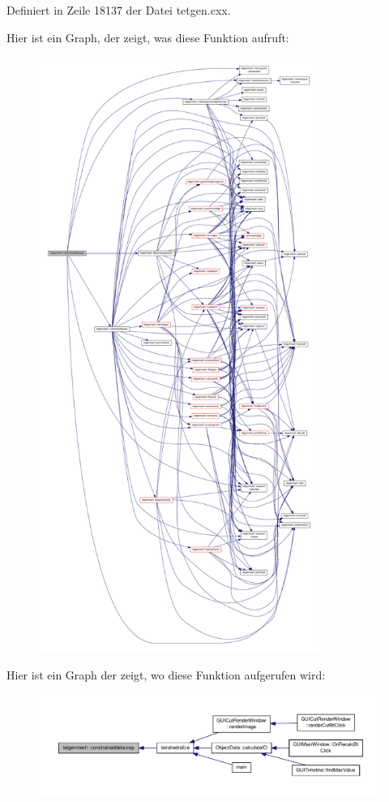 Definiert in Zeile 18137 der Datei tetgen.\-cxx.



Hier ist ein Graph, der zeigt, was diese Funktion aufruft\-:
\nopagebreak
\begin{figure}[H]
\begin{center}
\leavevmode
\includegraphics[height=550pt]{classtetgenmesh_aab64d62b3d2b048a38158fb2bf678624_cgraph}
\end{center}
\end{figure}




Hier ist ein Graph der zeigt, wo diese Funktion aufgerufen wird\-:
\nopagebreak
\begin{figure}[H]
\begin{center}
\leavevmode
\includegraphics[width=350pt]{classtetgenmesh_aab64d62b3d2b048a38158fb2bf678624_icgraph}
\end{center}
\end{figure}


